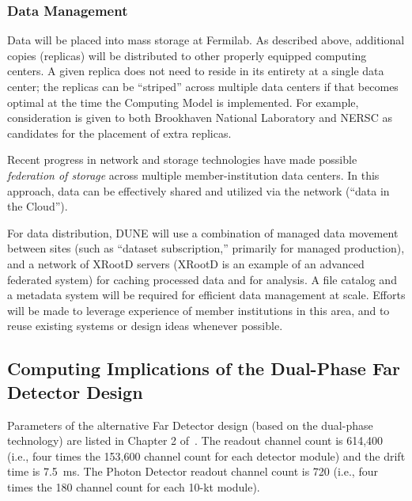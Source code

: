 \subsubsection{Data Management}
\label{sec:detectors-sc-infrastructure-computing-model-data-mgt}

Data will be placed into mass storage at Fermilab. As
described above, additional copies (replicas) will be distributed to
other properly equipped computing centers. %
A given %
replica does not %
need to reside in its entirety at
a single data center; the replicas can be ``striped'' across multiple %
data centers if that becomes optimal at the time %
the Computing Model is implemented. For example, consideration is given to both
Brookhaven National Laboratory and NERSC as candidates for the
placement of extra replicas. 

Recent progress in network and storage technologies have made possible
\textit{federation of storage} across multiple member-institution data centers. %
In this approach, data can be effectively shared
and utilized via the network (``data in the Cloud''). 

For data distribution, DUNE will use a combination of managed data movement between
sites (such as ``dataset subscription,'' primarily for managed
production), and a network of XRootD servers (XRootD is an example of an advanced federated system) for caching processed data
and for analysis.  A file catalog and a metadata system
will be required for efficient data management at scale. Efforts
will be made to leverage experience of member institutions in this
area, and to reuse existing systems or design ideas whenever
possible.

\subsection{Computing Implications of the Dual-Phase Far Detector Design}
\label{sec:detectors-sc-alternate}
Parameters of the alternative Far Detector design (based on the
dual-phase technology) are listed in Chapter 2 of~\cite{cdr-annex-rates}. The readout channel count is 614,400 (i.e., four times the
          153,600 channel count for each  detector module) and the drift time is 7.5~ms.
The Photon Detector readout channel count is 720 (i.e., four times the 180
          channel count for each 10-kt module).

